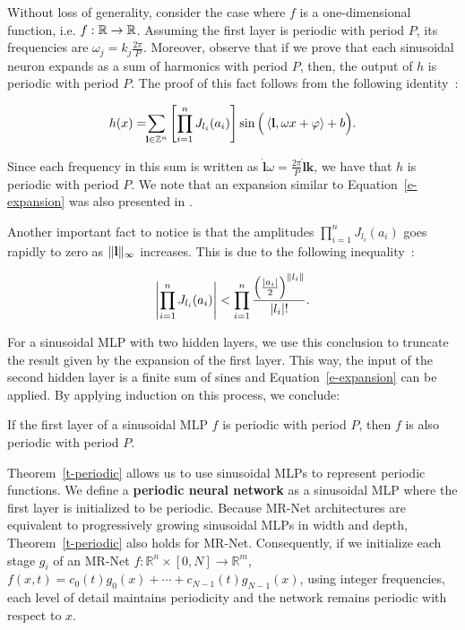 Without loss of generality, consider the case where $f$ is a one-dimensional function, i.e. $f:\mathbb{R}\to\mathbb{R}$. Assuming the first layer is periodic with period \( P \), its frequencies are \( \omega_j = k_j \frac{2\pi}{P} \). Moreover, observe that if we prove that each sinusoidal neuron  expands as a sum of harmonics with period $P$, then, the output of $h$ is periodic with period $P$. The proof of this fact follows from the following identity~\citep{novello2022understanding}:


\begin{align}\label{e-expansion}
    h(x)= \!\!\sum_{\textbf{l}\in\mathbb{Z}^n}\left[\prod_{i=1}^n J_{l_i}(a_i)\right]\sin\Big(\left\langle\textbf{l},\omega x +\varphi\right\rangle+ b\Big).
\end{align}

Since each frequency in this sum is written as $\dot{\textbf{l}}{\omega}=\frac{2\pi}{P}\dot{\textbf{l}}{\textbf{k}}$, we have that $h$ is periodic with period $P$.
We note that an expansion similar to Equation~\ref{e-expansion} was also presented in \cite{yuce2022structured}.

Another important fact to notice is that the amplitudes $\prod_{i=1}^n J_{l_i}(a_i)$ goes rapidly to zero as $\lVert\textbf{l}\rVert_{\infty}$ increases. This is due to the following inequality~\citep{novello2022understanding}:

\begin{align}\label{e-upper-bound-freq}
    \left|\prod_{i=1}^n J_{l_i}(a_i)\right|<
    \prod_{i=1}^n\frac{\left(\frac{\left|a_i\right|}{2}\right)^{\lVert l_i\rVert}}{\left|l_i\right|!}.
\end{align}

For a sinusoidal MLP with two hidden layers, we use this conclusion to truncate the result given by the expansion of the first layer. This way, the input of the second hidden layer is a finite sum of sines and Equation~\ref{e-expansion} can be applied. By applying induction on this process, we conclude:

\begin{theorem}
\label{t-periodic}
    If the first layer of a sinusoidal MLP $f$ is periodic with period $P$, then $f$ is also periodic with period $P$.
\end{theorem}

Theorem~\ref{t-periodic} allows us to use sinusoidal MLPs to represent periodic functions. We define a \textbf{periodic neural network} as a sinusoidal MLP where the first layer is initialized to be periodic. Because MR-Net architectures are equivalent to progressively growing sinusoidal MLPs in width and depth, Theorem~\ref{t-periodic} also holds for MR-Net. Consequently, if we initialize each stage \( g_i \) of an MR-Net \( f: \mathbb{R}^n \times [0, N] \to \mathbb{R}^m \), \( f(x, t) = c_0(t) g_0(x) + \cdots + c_{N-1}(t) g_{N-1}(x) \), using integer frequencies, each level of detail maintains periodicity and the network remains periodic with respect to \( x \).

